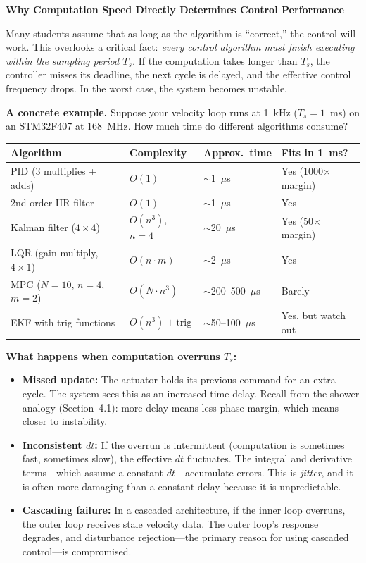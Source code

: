 \vspace{0.5em}
\begin{mdframed}[linewidth=1pt, innertopmargin=10pt, innerbottommargin=10pt]
\textbf{Why Computation Speed Directly Determines Control Performance}

\vspace{0.3em}
Many students assume that as long as the algorithm is ``correct,'' the control will work. This overlooks a critical fact: \textit{every control algorithm must finish executing within the sampling period $T_s$.} If the computation takes longer than $T_s$, the controller misses its deadline, the next cycle is delayed, and the effective control frequency drops. In the worst case, the system becomes unstable.

\textbf{A concrete example.} Suppose your velocity loop runs at 1~kHz ($T_s = 1$~ms) on an STM32F407 at 168~MHz. How much time do different algorithms consume?

\begin{center}
\begin{tabular}{llll}
\toprule
\textbf{Algorithm} & \textbf{Complexity} & \textbf{Approx.\ time} & \textbf{Fits in 1~ms?} \\
\midrule
PID (3 multiplies + adds) & $O(1)$ & $\sim$1~$\mu$s & Yes (1000$\times$ margin) \\
2nd-order IIR filter & $O(1)$ & $\sim$1~$\mu$s & Yes \\
Kalman filter ($4 \times 4$) & $O(n^3)$, $n=4$ & $\sim$20~$\mu$s & Yes (50$\times$ margin) \\
LQR (gain multiply, $4 \times 1$) & $O(n \cdot m)$ & $\sim$2~$\mu$s & Yes \\
MPC ($N=10$, $n=4$, $m=2$) & $O(N \cdot n^3)$ & $\sim$200--500~$\mu$s & Barely \\
EKF with trig functions & $O(n^3) + \text{trig}$ & $\sim$50--100~$\mu$s & Yes, but watch out \\
\bottomrule
\end{tabular}
\end{center}

\textbf{What happens when computation overruns $T_s$:}
\begin{itemize}[nosep]
    \item \textbf{Missed update:} The actuator holds its previous command for an extra cycle. The system sees this as an increased time delay. Recall from the shower analogy (Section~4.1): more delay means less phase margin, which means closer to instability.
    \item \textbf{Inconsistent $dt$:} If the overrun is intermittent (computation is sometimes fast, sometimes slow), the effective $dt$ fluctuates. The integral and derivative terms---which assume a constant $dt$---accumulate errors. This is \textit{jitter}, and it is often more damaging than a constant delay because it is unpredictable.
    \item \textbf{Cascading failure:} In a cascaded architecture, if the inner loop overruns, the outer loop receives stale velocity data. The outer loop's response degrades, and disturbance rejection---the primary reason for using cascaded control---is compromised.
\end{itemize}


\end{mdframed}
